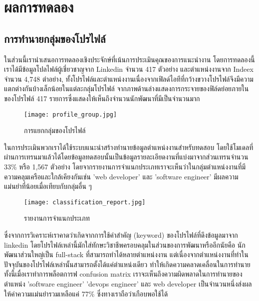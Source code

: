 \chapter{ผลการทดลอง}

\section{การทำนายกลุ่มของโปรไฟล์}

\label{chapter:result}
ในส่วนนี้เรานำเสนอการทดลองเชิงประจักษ์ที่เน้นการประเมินคุณของการแนะนำงาน โดยการทดลองนี้เราได้มีข้อมูลโปลไฟล์ผู้เชี่ยวชาญจาก Linkedin จำนวน 417 ตัวอย่าง และตำแหน่งงานจาก Indeex จำนวน 4,748 ตำอย่าง, ทั้งโปรไฟล์และตำแหน่งงานเนื่องจากเฟิลด์ไอทีที่กว้างขวางโปรไฟล์จึงมีความแตกต่างกันบ้างเล็กน้อยในแต่ละกลุ่มโปรไฟล์ จากภาพด้านล่างแสดงการกระจายของฟิล์ดย่อยภายในของโปรไฟล์ 417 รายการซึ่งแสดงให้เห็นถึงจำนวนนักพัฒนาที่มีเป็นจำนวนมาก
\newline
\begin{figure}[!h]
  \centering
  \texttt{[image: profile\_group.jpg]}  
  \caption{การแยกกลุ่มของโปรไฟล์}
  \label{Fig:result-profile-group}
\end{figure}

ในการประเมินพวกเราได้ใช้ระบบแนะนำสร้างทำนายข้อมูลตำแหน่งงานสำหรับทดสอบ โดยใช้โมเดลที่ผ่านการเทรนมาแล้วได้โดยข้อมูลทดสอบนั้นเป็นข้อมูลรายละเอียดงานที่แบ่งมาจากส่วนเทรนจำนวน 33\% หรือ 1,567 ตัวอย่าง โดยจากรายงานการจำแนกประเภทเราจะเห็นว่าในกลุ่มตำแหน่งงานที่มีความคลุมเครือและใกล้เคียงกันเช่น 'web developer' และ 'software engineer' มีผลความแม่นยำที่น้อยเมื่อเทียบกับกลุ่มอื่น ๆ 

\begin{figure}[!h]
  \centering
  \texttt{[image: classification\_report.jpg]}  
  \caption{รายงานการจำแนกประเภท}
  \label{Fig:result-classify-report}
\end{figure}

\newpage
ซึ่งจากการวิเคราะห์เราคาดว่าเกิดจากการใช้คำสำคัญ (keyword) ของโปรไฟล์ที่ดึงข้อมูลมาจาก linkedin โดยโปรไฟล์เหล่านี้มักใส่ทักษะวิชาชีพครอบคลุมในส่วนของการพัฒนาหรืออีกนัยคือ นักพัฒนาส่วนใหญ่เป็น full-stack ที่สามารถทำได้หลายตำแหน่งงาน แต่เนื่องจากตำแหน่งงานที่ทำในปัจจุบันของโปรไฟล์เหล่านั้นสามารถตั้งได้แค่ตำแหน่งเดียว ทำให้เกิดความคลาดเคลื่อนในการทำนาย
ทั้งนี้เมื่อเราทำการพล็อตการฟ confusion matrix เราจะเห็นถึงความผิดพลาดในการทำนายของตำแหน่ง 'software engineer' 'devops engineer' และ web developer เป็นจำนวนหนึ่งส่งผลให้ค่าความแม่นยำรวมเหลือแค่ 77\% ซึ่งทางเราถือว่าเกือบพอใช้ได้

